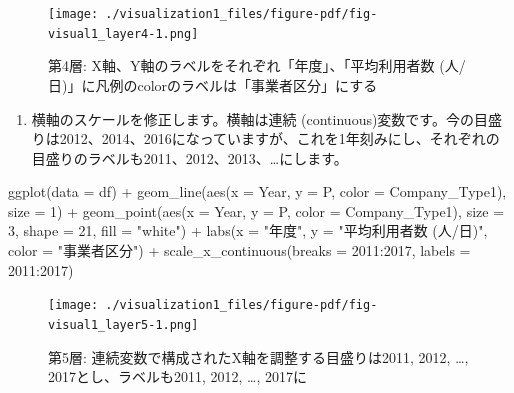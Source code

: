 \documentclass[
  a4paper,
  pandoc,
  ja=standard,
  jafont=haranoaji]{bxjsbook}
\newenvironment{Shaded}{\begin{snugshade}}{\end{snugshade}}
\newcommand{\AttributeTok}[1]{\textcolor[rgb]{0.00,0.48,0.65}{#1}}
\newcommand{\DecValTok}[1]{\textcolor[rgb]{0.68,0.00,0.00}{#1}}
\newcommand{\FunctionTok}[1]{\textcolor[rgb]{0.28,0.35,0.67}{#1}}
\newcommand{\NormalTok}[1]{\textcolor[rgb]{0.00,0.48,0.65}{#1}}
\newcommand{\SpecialCharTok}[1]{\textcolor[rgb]{0.37,0.37,0.37}{#1}}
\newcommand{\StringTok}[1]{\textcolor[rgb]{0.13,0.47,0.30}{#1}}
\providecommand{\tightlist}{%
  \setlength{\itemsep}{0pt}\setlength{\parskip}{0pt}}
\begin{document}
\begin{figure}[H]

{\centering \texttt{[image: ./visualization1\_files/figure-pdf/fig-visual1\_layer4-1.png]}

}

\caption{\label{fig-visual1_layer4}第4層:
X軸、Y軸のラベルをそれぞれ「年度」、「平均利用者数
(人/日)」に凡例のcolorのラベルは「事業者区分」にする}

\end{figure}

\begin{enumerate}
\def\labelenumi{\arabic{enumi}.}
\setcounter{enumi}{4}
\tightlist
\item
  横軸のスケールを修正します。横軸は連続
  (continuous)変数です。今の目盛りは2012、2014、2016になっていますが、これを1年刻みにし、それぞれの目盛りのラベルも2011、2012、2013、\ldots にします。
\end{enumerate}

\begin{Shaded}
\begin{Highlighting}[numbers=left,,]
\FunctionTok{ggplot}\NormalTok{(}\AttributeTok{data =}\NormalTok{ df) }\SpecialCharTok{+}
  \FunctionTok{geom\_line}\NormalTok{(}\FunctionTok{aes}\NormalTok{(}\AttributeTok{x =}\NormalTok{ Year, }\AttributeTok{y =}\NormalTok{ P, }\AttributeTok{color =}\NormalTok{ Company\_Type1), }
            \AttributeTok{size =} \DecValTok{1}\NormalTok{) }\SpecialCharTok{+}
  \FunctionTok{geom\_point}\NormalTok{(}\FunctionTok{aes}\NormalTok{(}\AttributeTok{x =}\NormalTok{ Year, }\AttributeTok{y =}\NormalTok{ P, }\AttributeTok{color =}\NormalTok{ Company\_Type1), }
             \AttributeTok{size =} \DecValTok{3}\NormalTok{, }\AttributeTok{shape =} \DecValTok{21}\NormalTok{, }\AttributeTok{fill =} \StringTok{"white"}\NormalTok{) }\SpecialCharTok{+}
  \FunctionTok{labs}\NormalTok{(}\AttributeTok{x =} \StringTok{"年度"}\NormalTok{, }\AttributeTok{y =} \StringTok{"平均利用者数 (人/日)"}\NormalTok{, }\AttributeTok{color =} \StringTok{"事業者区分"}\NormalTok{) }\SpecialCharTok{+}
  \FunctionTok{scale\_x\_continuous}\NormalTok{(}\AttributeTok{breaks =} \DecValTok{2011}\SpecialCharTok{:}\DecValTok{2017}\NormalTok{, }\AttributeTok{labels =} \DecValTok{2011}\SpecialCharTok{:}\DecValTok{2017}\NormalTok{)}
\end{Highlighting}
\end{Shaded}

\begin{figure}[H]

{\centering \texttt{[image: ./visualization1\_files/figure-pdf/fig-visual1\_layer5-1.png]}

}

\caption{\label{fig-visual1_layer5}第5層:
連続変数で構成されたX軸を調整する目盛りは2011, 2012, \ldots,
2017とし、ラベルも2011, 2012, \ldots, 2017に}

\end{figure}
\end{document}
